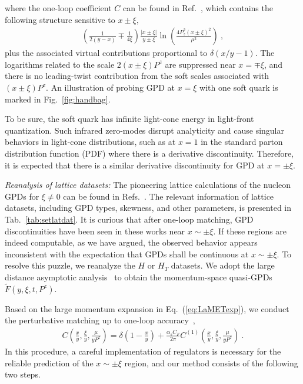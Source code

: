 \documentclass[prl,aps,twocolumn,preprintnumbers, showpacs, nofootinbib,superscriptaddress,notitlepage]{revtex4-1}
\begin{document}
where the one-loop coefficient $C$ can be found in Ref.~\cite{Ji:2015qla,Xiong:2015nua,Liu:2019urm,Yao:2022vtp}, which contains the following structure sensitive to 
$x\pm\xi,$
\begin{align}\label{eq:qlog}
\left(\frac{1}{2(y-x)}\mp\frac{1}{ 4 \xi }\right) \frac{|x\pm\xi|}{y\pm\xi} \ln \left(\frac{4P_z^2 (x\pm\xi )^2}{\mu ^2}\right) \ ,
\end{align}
plus the associated virtual contributions proportional to $\delta(x/y-1)$. The logarithms related to the scale $2(x\pm \xi)P^z$  are suppressed near $x=\mp \xi$, and there is no leading-twist contribution from the soft scales associated with $(x \pm \xi)P^z$. An illustration of probing GPD at $x=\xi$ with one soft quark is marked in Fig.~\ref{fig:handbag}.

To be sure, the soft quark has infinite light-cone energy in light-front quantization. Such infrared zero-modes disrupt analyticity and cause singular behaviors in light-cone distributions, such as at $x=1$ in the standard parton distribution function (PDF) where there is a derivative discontinuity. Therefore, it is expected that there is a similar derivative discontinuity for GPD at $x=\pm \xi$. 


\vspace{0.1in}
\textit{Reanalysis of lattice datasets:}
The pioneering lattice calculations of the nucleon GPDs for $\xi\ne 0$ can be found in Refs.~\cite{Alexandrou:2020zbe,Alexandrou:2021bbo,Holligan:2023jqh,Chu:2025kew}. The relevant information of lattice datasets, including GPD types, skewness, and other parameters, is presented in Tab.~\ref{tab:setlatdat}. It is curious that after one-loop matching, GPD discontinuities have been seen in these works near $x\sim \pm \xi$. If these regions are indeed computable, as we have argued, the observed behavior appears inconsistent with the expectation that GPDs shall be continuous at $x\sim \pm \xi$. 
To resolve this puzzle, we reanalyze the $H$ or $H_T$ datasets. We adopt the large distance asymptotic analysis~\cite{Ji:2020brr,Gao:2021dbh,Chen:2025cxr,Ji:2026vir} to obtain the momentum-space quasi-GPDs $\tilde{F}(y,\xi,t,P^z)$. 

Based on the large momentum expansion in Eq.~(\ref{eq:LaMETexp}), we conduct the perturbative matching up to one-loop accuracy~\cite{Ji:2015qla,Xiong:2015nua,Liu:2019urm,Yao:2022vtp}, 
\begin{align}
C\left(\frac{x}{y},\frac{\xi}{y},\frac{\mu}{y P^z}\right) = \delta\left(1-\frac{x}{y}\right) + \frac{\alpha_s C_F}{2\pi} C^{(1)}\left(\frac{x}{y},\frac{\xi}{y},\frac{\mu}{y P^z}\right) \ .
\end{align}
In this procedure, a careful implementation of regulators is necessary for the reliable prediction of the $x\sim \pm\xi$ region, and our method consists of the following two steps.
\end{document}
